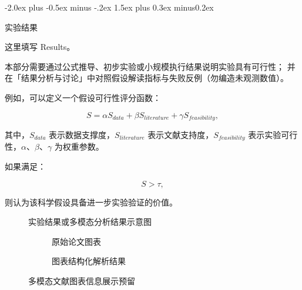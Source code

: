 \documentclass{article}
\makeatletter
\def\section{%
  \@startsection{section}{1}{\z@}%
  {-2.0ex plus -0.5ex minus -.2ex}%
  {1.5ex plus 0.3ex minus0.2ex}%
  {\large\bfseries\raggedright}%
}
\makeatother
\begin{document}
\section{实验结果}

这里填写 Results。

本部分需要通过公式推导、初步实验或小规模执行结果说明实验具有可行性；
并在「结果分析与讨论」中对照假设解读指标与失败反例（勿编造未观测数值）。

例如，可以定义一个假设可行性评分函数：

\begin{equation}
S = \alpha S_{data} + \beta S_{literature} + \gamma S_{feasibility},
\end{equation}

其中，$S_{data}$ 表示数据支撑度，$S_{literature}$ 表示文献支持度，$S_{feasibility}$ 表示实验可行性，$\alpha$、$\beta$、$\gamma$ 为权重参数。

如果满足：

\begin{equation}
S > \tau,
\end{equation}

则认为该科学假设具备进一步实验验证的价值。

\begin{figure}[H]
    \centering
    \caption{实验结果或多模态分析结果示意图}
    \label{fig:results}
\end{figure}

\begin{figure}[H]
    \centering
    \begin{subfigure}{0.45\textwidth}
        \centering
        \caption{原始论文图表}
        \label{fig:paper_a}
    \end{subfigure}
    \hfill
    \begin{subfigure}{0.45\textwidth}
        \centering
        \caption{图表结构化解析结果}
        \label{fig:paper_b}
    \end{subfigure}
    \caption{多模态文献图表信息展示预留}
    \label{fig:multimodal_paper_figures}
\end{figure}


\end{document}
